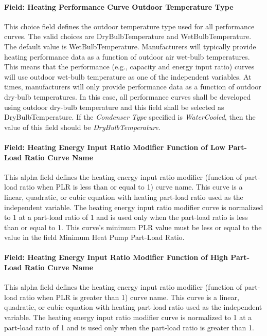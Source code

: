 \paragraph{Field: Heating Performance Curve Outdoor Temperature Type}\label{field-heating-performance-curve-outdoor-temperature-type}

This choice field defines the outdoor temperature type used for all performance curves. The valid choices are DryBulbTemperature and WetBulbTemperature. The default value is WetBulbTemperature. Manufacturers will typically provide heating performance data as a function of outdoor air wet-bulb temperatures. This means that the performance (e.g., capacity and energy input ratio) curves will use outdoor wet-bulb temperature as one of the independent variables. At times, manufacturers will only provide performance data as a function of outdoor dry-bulb temperatures. In this case, all performance curves shall be developed using outdoor dry-bulb temperature and this field shall be selected as DryBulbTemperature. If the \textit{Condenser Type} specified is \textit{WaterCooled}, then the value of this field should be \textit{DryBulbTemperature}. 

\paragraph{Field: Heating Energy Input Ratio Modifier Function of Low Part-Load Ratio Curve Name}\label{field-heating-energy-input-ratio-modifier-function-of-low-part-load-ratio-curve-name}

This alpha field defines the heating energy input ratio modifier (function of part-load ratio when PLR is less than or equal to 1) curve name. This curve is a linear, quadratic, or cubic equation with heating part-load ratio used as the independent variable. The heating energy input ratio modifier curve is normalized to 1 at a part-load ratio of 1 and is used only when the part-load ratio is less than or equal to 1. This curve's minimum PLR value must be less or equal to the value in the field Minimum Heat Pump Part-Load Ratio.

\paragraph{Field: Heating Energy Input Ratio Modifier Function of High Part-Load Ratio Curve Name}\label{field-heating-energy-input-ratio-modifier-function-of-high-part-load-ratio-curve-name}

This alpha field defines the heating energy input ratio modifier (function of part-load ratio when PLR is greater than 1) curve name. This curve is a linear, quadratic, or cubic equation with heating part-load ratio used as the independent variable. The heating energy input ratio modifier curve is normalized to 1 at a part-load ratio of 1 and is used only when the part-load ratio is greater than 1.

